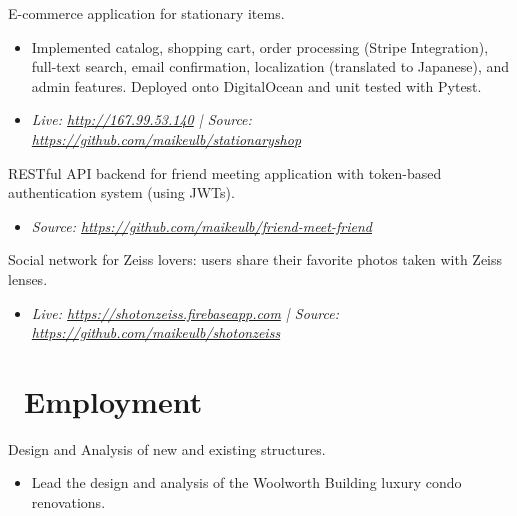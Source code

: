 \documentclass{resume}
\begin{document}
E-commerce application for stationary items.
\begin{itemize}
  \item Implemented catalog, shopping cart, order processing (Stripe Integration), full-text search, email confirmation, localization (translated to Japanese), and admin features. Deployed onto DigitalOcean and unit tested with Pytest.
  \item \textit{Live: \href{http://167.99.53.140}{http://167.99.53.140} | 
                Source: \href{https://github.com/maikeulb/stationaryshop}{https://github.com/maikeulb/stationaryshop}}
\end{itemize}

RESTful API backend for friend meeting application with token-based authentication system (using JWTs).
\begin{itemize}
   \item \textit{Source: \href{https://github.com/maikeulb/friend-meet-friend}{https://github.com/maikeulb/friend-meet-friend}}
\end{itemize}

Social network for Zeiss lovers: users share their favorite photos taken with
Zeiss lenses.
\begin{itemize}
   \item \textit{Live: \href{https://shotonzeiss.firebaseapp.com}{https://shotonzeiss.firebaseapp.com} |
                 Source: \href{https://github.com/maikeulb/shotonzeiss}{https://github.com/maikeulb/shotonzeiss}}
\end{itemize}


\section{\faUsers\ Employment}

Design and Analysis of new and existing structures.
\begin{itemize}
  \item Lead the design and analysis of the Woolworth Building
          luxury condo renovations. 
\end{itemize}
\end{document}
